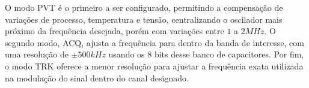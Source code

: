 %
%
%


O modo PVT é o primeiro a ser configurado, permitindo a compensação de variações de processo, temperatura e tensão, centralizando o oscilador mais próximo da frequência desejada, porém com variações entre $1$ a $2MHz$. O segundo modo, ACQ, ajusta a frequência para dentro da banda de interesse, com uma resolução de $\pm 500kHz$ usando os 8 bits desse banco de capacitores. Por fim, o modo TRK oferece a menor resolução para ajustar a frequência exata utilizada na modulação do sinal dentro do canal designado.

